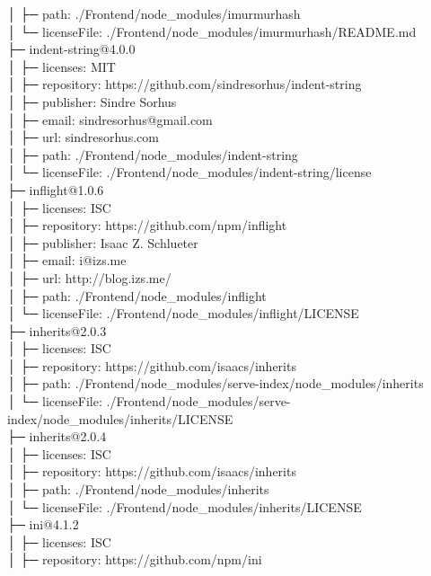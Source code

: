 \documentclass[
    paper=a4,
    twoside=false,
    parskip=half,
    listof=entryprefix,
    listof=totoc,
    index=totoc,
    bibliography=totoc,
    headsepline,
]{scrbook}
\begin{document}
    │  ├─ path: ./Frontend/node\_modules/imurmurhash\\
    │  └─ licenseFile: ./Frontend/node\_modules/imurmurhash/README.md\\
    ├─ indent-string@4.0.0\\
    │  ├─ licenses: MIT\\
    │  ├─ repository: https://github.com/sindresorhus/indent-string\\
    │  ├─ publisher: Sindre Sorhus\\
    │  ├─ email: sindresorhus@gmail.com\\
    │  ├─ url: sindresorhus.com\\
    │  ├─ path: ./Frontend/node\_modules/indent-string\\
    │  └─ licenseFile: ./Frontend/node\_modules/indent-string/license\\
    ├─ inflight@1.0.6\\
    │  ├─ licenses: ISC\\
    │  ├─ repository: https://github.com/npm/inflight\\
    │  ├─ publisher: Isaac Z. Schlueter\\
    │  ├─ email: i@izs.me\\
    │  ├─ url: http://blog.izs.me/\\
    │  ├─ path: ./Frontend/node\_modules/inflight\\
    │  └─ licenseFile: ./Frontend/node\_modules/inflight/LICENSE\\
    ├─ inherits@2.0.3\\
    │  ├─ licenses: ISC\\
    │  ├─ repository: https://github.com/isaacs/inherits\\
    │  ├─ path: ./Frontend/node\_modules/serve-index/node\_modules/inherits\\
    │  └─ licenseFile: ./Frontend/node\_modules/serve-index/node\_modules/inherits/LICENSE\\
    ├─ inherits@2.0.4\\
    │  ├─ licenses: ISC\\
    │  ├─ repository: https://github.com/isaacs/inherits\\
    │  ├─ path: ./Frontend/node\_modules/inherits\\
    │  └─ licenseFile: ./Frontend/node\_modules/inherits/LICENSE\\
    ├─ ini@4.1.2\\
    │  ├─ licenses: ISC\\
    │  ├─ repository: https://github.com/npm/ini\\
\end{document}
